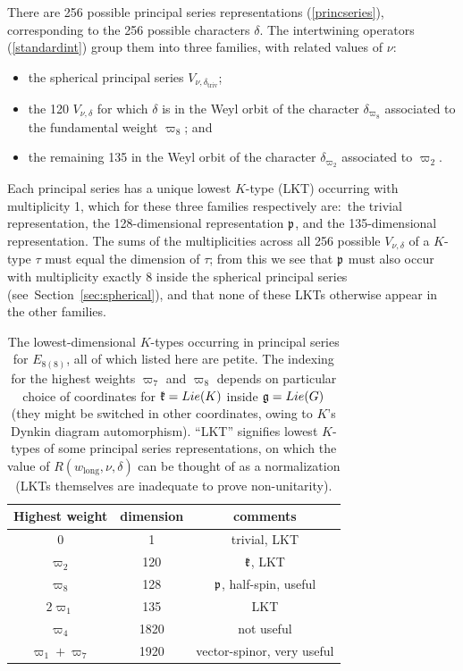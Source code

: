 \documentclass[12pt]{article}
\newcommand{\secref}[1]{Section~\ref{#1}}
\numberwithin{equation}{section}
\renewcommand\({\left(}
\renewcommand\){\right)}
\begin{document}
There are 256 possible principal series representations (\ref{princseries}), corresponding to the 256 possible characters $\delta$.  The intertwining operators  (\ref{standardint}) group them into three   families, with related values of $\nu$:
\begin{itemize}
  \item the spherical principal series $V_{\nu,\delta_{\text{triv}}}$;
  \item the 120 $V_{\nu,\delta}$ for which $\delta$ is in the Weyl orbit of the character $\delta_{\varpi_8}$ associated to the fundamental weight $\varpi_8$; and
  \item the remaining 135 in the Weyl orbit of the character $\delta_{\varpi_2}$ associated to $\varpi_2$.
\end{itemize}
 Each principal series has a unique lowest $K$-type (LKT) occurring with multiplicity 1, which for these three families respectively are:~the trivial representation, the 128-dimensional representation $\frak p$, and the 135-dimensional representation.  The sums of the multiplicities  across all 256 possible $V_{\nu,\delta}$ of a $K$-type $\tau$ must equal the dimension of $\tau$; from this we see that $\frak p$ must also occur with multiplicity  exactly 8 inside the spherical principal series (see~\secref{sec:spherical}), and that none of these LKTs otherwise appear in the other families.

\begin{table}
\begin{center}
\begin{tabular}{c|c|c}
Highest weight & dimension & comments \\
\hline
0 & 1 & trivial, LKT \\
$\varpi_2$ & 120 & $\frak k$, LKT\\
$\varpi_8$ & 128 & $\frak p$, half-spin, useful \\
$2\varpi_1$ & 135 & LKT \\
$\varpi_4$ & 1820 &  not useful\\
$\varpi_1+\varpi_7$ & 1920 & vector-spinor, very useful \\
\end{tabular}
\end{center}
\caption{The lowest-dimensional $K$-types occurring in principal series for $E_{8(8)}$, all of which listed here are petite.  The indexing for the highest weights $\varpi_7$ and $\varpi_8$ depends on particular choice of coordinates for ${\frak k}=Lie(K)$ inside ${\frak g}=Lie(G)$ (they might be switched in other coordinates, owing to $K$'s Dynkin diagram automorphism).  ``LKT'' signifies lowest $K$-types of some principal series representations, on which the value of $R(w_\text{long},\nu,\delta)$  can be thought of as a normalization (LKTs themselves are inadequate to prove non-unitarity).
\label{E8table}}
\end{table}
\end{document}
